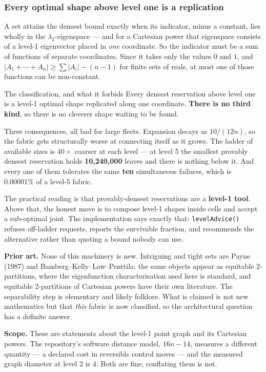 \documentclass[11pt,letterpaper]{article}
\begin{document}
\subsubsection{Every optimal shape above level one is a replication}

A set attains the densest bound exactly when its indicator, minus a constant,
lies wholly in the $\lambda_2$-eigenspace --- and for a Cartesian power that
eigenspace consists of a level-1 eigenvector placed in \emph{one} coordinate. So
the indicator must be a sum of functions of separate coordinates. Since it takes
only the values $0$ and $1$, and $|A_1+\cdots+A_n| \ge \sum|A_i| - (n-1)$ for
finite sets of reals, at most one of those functions can be non-constant.

\begin{keybox}{The classification, and what it forbids}
Every densest reservation above level one is a level-1 optimal shape replicated
along one coordinate. \textbf{There is no third kind}, so there is no cleverer
shape waiting to be found.

\smallskip
Three consequences, all bad for large fleets. Expansion decays as $10/(12n)$, so
the fabric gets structurally worse at connecting itself as it grows. The ladder
of available sizes is $40\times$ coarser at each level --- at level 5 the
smallest provably densest reservation holds \textbf{10,240,000} leaves and there
is nothing below it. And every one of them tolerates the same \textbf{ten}
simultaneous failures, which is $0.00001\%$ of a level-5 fabric.
\end{keybox}

The practical reading is that provably-densest reservations are a
\textbf{level-1 tool}. Above that, the honest move is to compose level-1 shapes
inside cells and accept a sub-optimal joint. The implementation says exactly
that: \texttt{levelAdvice()} refuses off-ladder requests, reports the survivable
fraction, and recommends the alternative rather than quoting a bound nobody can
use.

\begin{scopebox}
\textbf{Prior art.} None of this machinery is new. Intriguing and tight sets are
Payne (1987) and Bamberg--Kelly--Law--Penttila; the same objects appear as
equitable 2-partitions, where the eigenfunction characterisation used here is
standard, and equitable 2-partitions of Cartesian powers have their own
literature. The separability step is elementary and likely folklore. What is
claimed is not new mathematics but that \emph{this} fabric is now classified, so
the architectural question has a definite answer.

\smallskip
\textbf{Scope.} These are statements about the level-1 point graph and its
Cartesian powers. The repository's software distance model, $16n-14$, measures a
different quantity --- a declared cost in reversible control moves --- and the
measured graph diameter at level 2 is 4. Both are fine; conflating them is not.
\end{scopebox}
\end{document}
